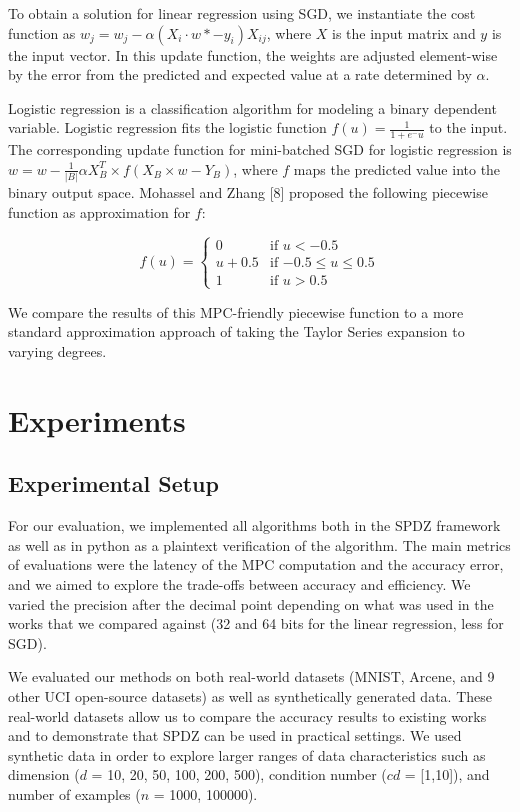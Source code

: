 \documentclass{article}
\begin{document}
To obtain a solution for linear regression using SGD, we instantiate the cost function as $w_j = w_j  - \alpha(X_i \cdot w *-y_i)X_{ij}$, where $X$ is the input matrix and $y$ is the input vector. In this update function, the weights are adjusted element-wise by the error from the predicted and expected value at a rate determined by $\alpha$.

Logistic regression is a classification algorithm for modeling a binary dependent variable. Logistic regression fits the logistic function $f(u) = \frac{1}{1+e^-u}$ to the input. The corresponding update function for mini-batched SGD for logistic regression is $ w = w - \frac{1}{|B|} \alpha X^{T}_{B} \times f(X_{B} \times w - Y_{B})$, where $f$ maps the predicted value into the binary output space. Mohassel and Zhang [8] proposed the following piecewise function as approximation for $f$:

\[
  f(u) =
  \begin{cases}
                                   0 & \text{if $u < -0.5$} \\
                                   u + 0.5 & \text{if $-0.5 \leq u \leq 0.5$} \\
1 & \text{if $u > 0.5$}
  \end{cases}
\]

We compare the results of this MPC-friendly piecewise function to a more standard approximation approach of taking the Taylor Series expansion to varying degrees.

\section{Experiments}

\subsection{Experimental Setup}

For our evaluation, we implemented all algorithms both in the SPDZ framework as well as in python as a plaintext verification of the algorithm.
The main metrics of evaluations were the latency of the MPC computation and the accuracy error, and we aimed to explore the trade-offs between accuracy and efficiency. We varied the precision after the decimal point 
depending on what was used in the works that we compared against (32 and 64 bits for the linear regression, less for SGD).

We evaluated our methods on both real-world datasets (MNIST, Arcene, and 9 other UCI open-source datasets) as well as synthetically generated data. These real-world datasets allow us to compare the accuracy results to existing works and to demonstrate that SPDZ can be used in practical settings. We used synthetic data in order to explore larger ranges of data characteristics such as dimension ($d$ = 10, 20, 50, 100, 200, 500), condition number ($cd$ = [1,10]), and number of examples ($n$ = 1000, 100000).
\end{document}
